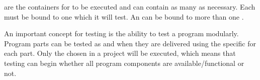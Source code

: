 \label{testsuite}

\gdsuites{} are the containers for \gdcases{} to be executed and can contain as many \gdcases{} as  necessary. 
Each \gdsuite{}  must be bound to one \gdaut{} which it will test. An \gdaut{} can be bound to more than one \gdsuite{}.  

 
An important concept for testing is the ability to test a program modularly.
Program parts can be tested as and when they 
are delivered using the specific \gdsuites{} for each part. Only the chosen
\gdsuite{} in a project will be executed, which means that 
testing can begin whether all program components are available/functional
 or not. 










